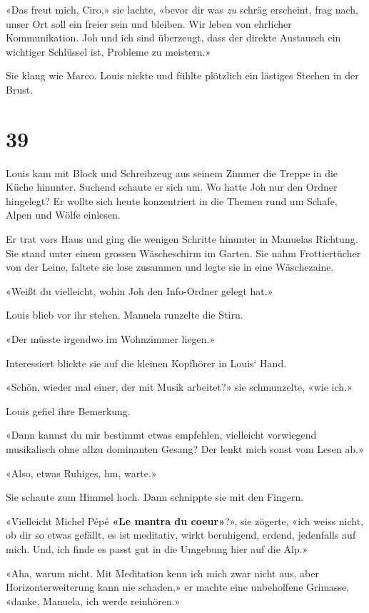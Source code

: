 «Das freut mich, Ciro,» sie lachte, «bevor dir was \emph{zu} schräg
erscheint, frag nach, unser Ort soll ein freier sein und bleiben. Wir
leben von ehrlicher Kommunikation. Joh und ich sind überzeugt, dass der
direkte Austausch ein wichtiger Schlüssel ist, Probleme zu meistern.»

Sie klang wie Marco. Louis nickte und fühlte plötzlich ein lästiges
Stechen in der Brust.

\chapter{39}\label{section-38}

Louis kam mit Block und Schreibzeug aus seinem Zimmer die Treppe in die
Küche hinunter. Suchend schaute er sich um. Wo hatte Joh nur den Ordner
hingelegt? Er wollte sich heute konzentriert in die Themen rund um
Schafe, Alpen und Wölfe einlesen.

Er trat vors Haus und ging die wenigen Schritte hinunter in Manuelas
Richtung. Sie stand unter einem grossen Wäscheschirm im Garten. Sie nahm
Frottiertücher von der Leine, faltete sie lose zusammen und legte sie in
eine Wäschezaine.

«Weißt du vielleicht, wohin Joh den Info-Ordner gelegt hat.»

Louis blieb vor ihr stehen. Manuela runzelte die Stirn.

«Der müsste irgendwo im Wohnzimmer liegen.»

Interessiert blickte sie auf die kleinen Kopfhörer in Louis` Hand.

«Schön, wieder mal einer, der mit Musik arbeitet?» sie schmunzelte, «wie
ich.»

Louis gefiel ihre Bemerkung.

«Dann kannst du mir bestimmt etwas empfehlen, vielleicht vorwiegend
musikalisch ohne allzu dominanten Gesang? Der lenkt mich sonst vom Lesen
ab.»

«Also, etwas Ruhiges, hm, warte.»

Sie schaute zum Himmel hoch. Dann schnippte sie mit den Fingern.

«Vielleicht Michel Pépé \textbf{«Le mantra du coeur»}?», sie zögerte,
«ich weiss nicht, ob dir so etwas gefällt, es ist meditativ, wirkt
beruhigend, erdend, jedenfalls auf mich. Und, ich finde es passt gut in
die Umgebung hier auf die Alp.»

«Aha, warum nicht. Mit Meditation kenn ich mich zwar nicht aus, aber
Horizonterweiterung kann nie schaden,» er machte eine unbeholfene
Grimasse, «danke, Manuela, ich werde reinhören.»

